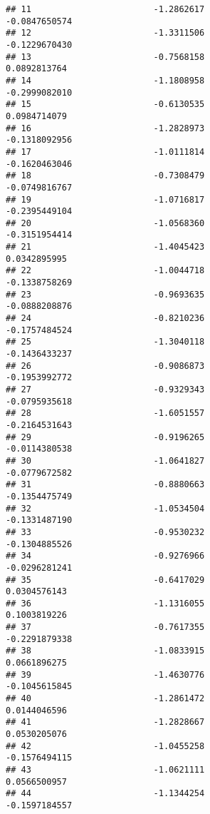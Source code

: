 \documentclass[
]{article}
\begin{document}
\begin{verbatim}
## 11                        -1.2862617                         -0.0847650574
## 12                        -1.3311506                         -0.1229670430
## 13                        -0.7568158                          0.0892813764
## 14                        -1.1808958                         -0.2999082010
## 15                        -0.6130535                          0.0984714079
## 16                        -1.2828973                         -0.1318092956
## 17                        -1.0111814                         -0.1620463046
## 18                        -0.7308479                         -0.0749816767
## 19                        -1.0716817                         -0.2395449104
## 20                        -1.0568360                         -0.3151954414
## 21                        -1.4045423                          0.0342895995
## 22                        -1.0044718                         -0.1338758269
## 23                        -0.9693635                         -0.0888208876
## 24                        -0.8210236                         -0.1757484524
## 25                        -1.3040118                         -0.1436433237
## 26                        -0.9086873                         -0.1953992772
## 27                        -0.9329343                         -0.0795935618
## 28                        -1.6051557                         -0.2164531643
## 29                        -0.9196265                         -0.0114380538
## 30                        -1.0641827                         -0.0779672582
## 31                        -0.8880663                         -0.1354475749
## 32                        -1.0534504                         -0.1331487190
## 33                        -0.9530232                         -0.1304885526
## 34                        -0.9276966                         -0.0296281241
## 35                        -0.6417029                          0.0304576143
## 36                        -1.1316055                          0.1003819226
## 37                        -0.7617355                         -0.2291879338
## 38                        -1.0833915                          0.0661896275
## 39                        -1.4630776                         -0.1045615845
## 40                        -1.2861472                          0.0144046596
## 41                        -1.2828667                          0.0530205076
## 42                        -1.0455258                         -0.1576494115
## 43                        -1.0621111                          0.0566500957
## 44                        -1.1344254                         -0.1597184557

\end{verbatim}
\end{document}
